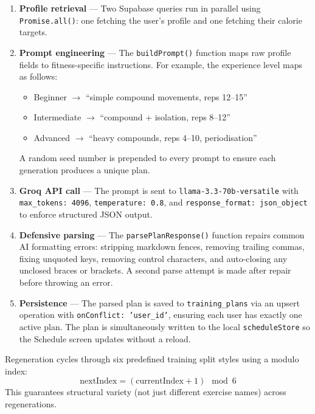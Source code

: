 \begin{enumerate}
    \item \textbf{Profile retrieval} — Two Supabase queries run in parallel
    using \texttt{Promise.all()}: one fetching the user's profile and one
    fetching their calorie targets.

    \item \textbf{Prompt engineering} — The \texttt{buildPrompt()} function
    maps raw profile fields to fitness-specific instructions. For example,
    the experience level maps as follows:
    \begin{itemize}
        \item Beginner $\rightarrow$ ``simple compound movements, reps 12–15''
        \item Intermediate $\rightarrow$ ``compound + isolation, reps 8–12''
        \item Advanced $\rightarrow$ ``heavy compounds, reps 4–10, periodisation''
    \end{itemize}
    A random seed number is prepended to every prompt to ensure each
    generation produces a unique plan.

    \item \textbf{Groq API call} — The prompt is sent to
    \texttt{llama-3.3-70b-versatile} with \texttt{max\_tokens: 4096},
    \texttt{temperature: 0.8}, and \texttt{response\_format: json\_object}
    to enforce structured JSON output.

    \item \textbf{Defensive parsing} — The \texttt{parsePlanResponse()}
    function repairs common AI formatting errors: stripping markdown fences,
    removing trailing commas, fixing unquoted keys, removing control
    characters, and auto-closing any unclosed braces or brackets. A second
    parse attempt is made after repair before throwing an error.

    \item \textbf{Persistence} — The parsed plan is saved to
    \texttt{training\_plans} via an upsert operation with
    \texttt{onConflict: 'user\_id'}, ensuring each user has exactly one
    active plan. The plan is simultaneously written to the local
    \texttt{scheduleStore} so the Schedule screen updates without a reload.
\end{enumerate}

Regeneration cycles through six predefined training split styles using a
modulo index:
\[
\text{nextIndex} = (\text{currentIndex} + 1) \mod 6
\]
This guarantees structural variety (not just different exercise names) across
regenerations.

